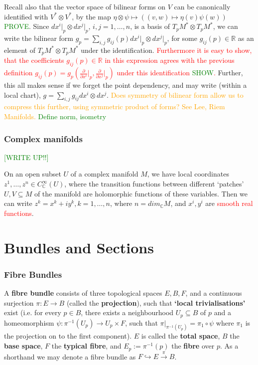 \documentclass[a4paper]{article}
\theoremstyle{definition} \newtheorem*{definition}{Definition}
\theoremstyle{definition} \newtheorem*{definitions}{Definitions}
\theoremstyle{plain} \newtheorem{theorem}{Theorem}[section]
\theoremstyle{plain} \newtheorem{proposition}[theorem]{Proposition}
\theoremstyle{plain} \newtheorem{corollary}[theorem]{Corollary}
\theoremstyle{plain} \newtheorem{lemma}[theorem]{Lemma}
\theoremstyle{plain} \newtheorem{example}[theorem]{Example}
\newcommand{\checkCorrect}[1]{\textcolor{red}{#1}}
\newcommand{\question}[1]{\textcolor{orange}{#1}}
\newcommand{\finish}[1]{\textcolor{green}{#1}}
\newcommand{\defn}[1]{\textbf{#1}}
\newcommand{\realnos}{\mathbb{R}}
\newcommand{\complexnos}{\mathbb{C}}
\newcommand{\smooth}{C^\infty}
\begin{document}
Recall also that the vector space of bilinear forms on $V$ can be canonically identified with $V^\ast \otimes V^\ast$, by the map $\eta\otimes \psi \mapsto ((v,w)\mapsto \eta(v)\psi(w))$ \finish{PROVE}. Since $dx^i\vert_p\otimes dx^j\vert_p$, $i,j=1,\ldots, n$, is a basis of $T_pM^\ast \otimes T_pM^\ast$, we can write the bilinear form $g_p=\sum_{i,j} g_{ij}(p)dx^i\vert_p \otimes dx^j\vert_p$, for some $g_{ij}(p)\in \realnos$ as an element of $T_pM^\ast \otimes T_pM^\ast$ under the identification. \checkCorrect{Furthermore it is easy to show, that the coefficients $g_{ij}(p)\in \realnos$ in this expression agrees with the previous definition $g_{ij}(p)=g_p(\frac{\partial}{\partial x^i}\vert_p, \frac{\partial}{\partial x^j}\vert_p)$ under this identification \finish{SHOW}.} Further, this all makes sense if we forget the point dependency, and may write (within a local chart), $g=\sum_{i,j}g_{ij} dx^i\otimes dx^j$. \question{Does symmetry of bilinear form allow us to compress this further, using symmetric product of forms? See Lee, Riem Manifolds.} 
\finish{Define norm, isometry}

\subsubsection{Complex manifolds}
\finish{[WRITE UP!!]}

On an open subset $U$ of a complex manifold $M$, we have local coordinates $z^1,\ldots, z^n\in \smooth_\complexnos (U)$, where the transition functions between different `patches' $U, V\subseteq M$ of the manifold are holomorphic functions of these variables. Then we can write $z^k=x^k+iy^k, k=1,\ldots, n$, where $n=dim_\complexnos M$, and $x^i, y^i$ are \checkCorrect{smooth real functions}. 

\section{Bundles and Sections}

\subsubsection{Fibre Bundles}

A \defn{fibre bundle} consists of three topological spaces $E, B, F$, and a continuous surjection $\pi:E\rightarrow B$ (called the \defn{projection}), such that \defn{`local trivialisations'} exist (i.e. for every $p\in B$, there exists a neighbourhood $U_p\subseteq B$ of $p$ and a homeomorphism $\psi: \pi^{-1}(U_p) \rightarrow U_p \times F$, such that $\pi \vert_{\pi^{-1}(U_p)} = \pi_1 \circ \psi$ where $\pi_1$ is the projection on to the first component). $E$ is called the \defn{total space}, $B$ the \defn{base space}, $F$ the \defn{typical fibre}, and $E_p:=\pi^{-1}(p)$ the \defn{fibre} over $p$. As a shorthand we may denote a fibre bundle as $F\hookrightarrow E\xrightarrow{\pi} B$.
\end{document}
